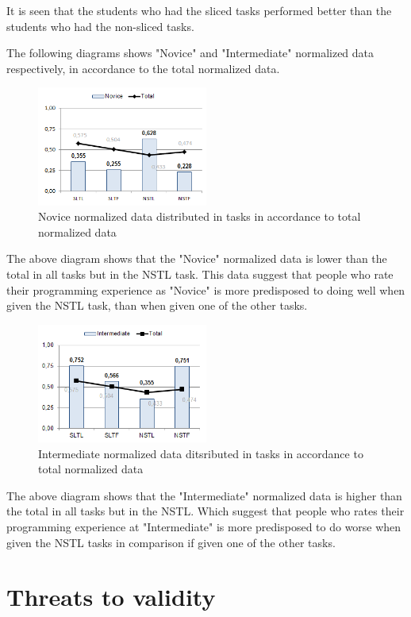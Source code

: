 \documentclass{sig-alternate-05-2015}
\begin{document}
It is seen that the students who had the sliced tasks performed better than the students who had the non-sliced tasks.

The following diagrams shows "Novice" and "Intermediate" normalized data respectively, in accordance to the total normalized data.

\begin{figure}[H]
	\centering
	\includegraphics[width=0.5\textwidth]{img11}
	\caption{Novice normalized data distributed in tasks in accordance to total normalized data}
\end{figure}

The above diagram shows that the "Novice" normalized data is lower than the total in all tasks but in the NSTL task. This data suggest that people who rate their programming experience as "Novice" is more predisposed to doing well when given the NSTL task, than when given one of the other tasks.

\begin{figure}[H]
	\centering
	\includegraphics[width=0.5\textwidth]{img12}
	\caption{Intermediate normalized data ditsributed in tasks in accordance to total normalized data}
\end{figure}

The above diagram shows that the "Intermediate" normalized data is higher than the total in all tasks but in the NSTL. Which suggest that people who rates their programming experience at "Intermediate" is more predisposed to do worse when given the NSTL tasks in comparison if given one of the other tasks.

\section{Threats to validity}
\end{document}
